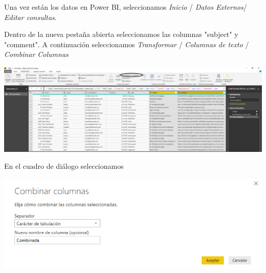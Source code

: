 \documentclass[english,runningheads,a4paper]{llncs}[2018/03/10]
\newenvironment{nscenter}
 {\parskip=0pt\par\nopagebreak\centering}
 {\par\noindent\ignorespacesafterend}
\begin{document}
    Una vez están los datos en Power BI, seleccionamos \textit{Inicio} / 
    \textit{Datos Externos}/ \textit{Editar consultas}.
    
    Dentro de la nueva pestaña abierta seleccionamos las columnas "subject" y 
    "comment". A continuación seleccionamos \textit{Transformar} / 
    \textit{Columnas de texto} / \textit{Combinar Columnas}
    
    \begin{nscenter}
        \includegraphics[scale=0.25]{./IA/AZURE/combinarColumnas.png}
    \end{nscenter}
    
    En el cuadro de diálogo seleccionamos 
    
    \begin{nscenter}
        \includegraphics[scale=0.25]{./IA/AZURE/comCol.png}
    \end{nscenter}
    
\end{document}
